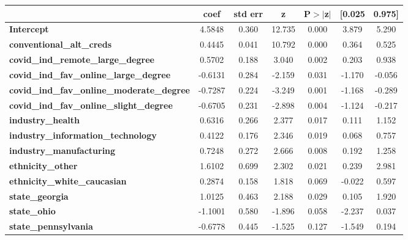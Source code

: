 \begin{center}
\begin{tabular}{lcccccc}
\toprule
                                                   & \textbf{coef} & \textbf{std err} & \textbf{z} & \textbf{P$> |$z$|$} & \textbf{[0.025} & \textbf{0.975]}  \\
\midrule
\textbf{Intercept}                                 &       4.5848  &        0.360     &    12.735  &         0.000        &        3.879    &        5.290     \\
\textbf{conventional\_alt\_creds}                  &       0.4445  &        0.041     &    10.792  &         0.000        &        0.364    &        0.525     \\
\textbf{covid\_ind\_remote\_large\_degree}         &       0.5702  &        0.188     &     3.040  &         0.002        &        0.203    &        0.938     \\
\textbf{covid\_ind\_fav\_online\_large\_degree}    &      -0.6131  &        0.284     &    -2.159  &         0.031        &       -1.170    &       -0.056     \\
\textbf{covid\_ind\_fav\_online\_moderate\_degree} &      -0.7287  &        0.224     &    -3.249  &         0.001        &       -1.168    &       -0.289     \\
\textbf{covid\_ind\_fav\_online\_slight\_degree}   &      -0.6705  &        0.231     &    -2.898  &         0.004        &       -1.124    &       -0.217     \\
\textbf{industry\_health}                          &       0.6316  &        0.266     &     2.377  &         0.017        &        0.111    &        1.152     \\
\textbf{industry\_information\_technology}         &       0.4122  &        0.176     &     2.346  &         0.019        &        0.068    &        0.757     \\
\textbf{industry\_manufacturing}                   &       0.7248  &        0.272     &     2.666  &         0.008        &        0.192    &        1.258     \\
\textbf{ethnicity\_other}                          &       1.6102  &        0.699     &     2.302  &         0.021        &        0.239    &        2.981     \\
\textbf{ethnicity\_white\_caucasian}               &       0.2874  &        0.158     &     1.818  &         0.069        &       -0.022    &        0.597     \\
\textbf{state\_georgia}                            &       1.0125  &        0.463     &     2.188  &         0.029        &        0.105    &        1.920     \\
\textbf{state\_ohio}                               &      -1.1001  &        0.580     &    -1.896  &         0.058        &       -2.237    &        0.037     \\
\textbf{state\_pennsylvania}                       &      -0.6778  &        0.445     &    -1.525  &         0.127        &       -1.549    &        0.194     \\
\bottomrule
\end{tabular}
\end{center}
